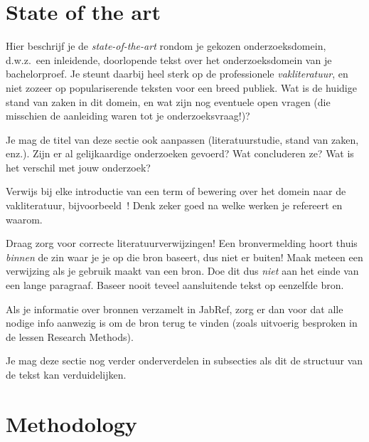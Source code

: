 \section{State of the art}%
\label{sec:state-of-the-art}

Hier beschrijf je de \emph{state-of-the-art} rondom je gekozen onderzoeksdomein, d.w.z.\ een inleidende, doorlopende tekst over het onderzoeksdomein van je bachelorproef. Je steunt daarbij heel sterk op de professionele \emph{vakliteratuur}, en niet zozeer op populariserende teksten voor een breed publiek. Wat is de huidige stand van zaken in dit domein, en wat zijn nog eventuele open vragen (die misschien de aanleiding waren tot je onderzoeksvraag!)?

Je mag de titel van deze sectie ook aanpassen (literatuurstudie, stand van zaken, enz.). Zijn er al gelijkaardige onderzoeken gevoerd? Wat concluderen ze? Wat is het verschil met jouw onderzoek?

Verwijs bij elke introductie van een term of bewering over het domein naar de vakliteratuur, bijvoorbeeld~\autocite{Hykes2013}! Denk zeker goed na welke werken je refereert en waarom.

Draag zorg voor correcte literatuurverwijzingen! Een bronvermelding hoort thuis \emph{binnen} de zin waar je je op die bron baseert, dus niet er buiten! Maak meteen een verwijzing als je gebruik maakt van een bron. Doe dit dus \emph{niet} aan het einde van een lange paragraaf. Baseer nooit teveel aansluitende tekst op eenzelfde bron.

Als je informatie over bronnen verzamelt in JabRef, zorg er dan voor dat alle nodige info aanwezig is om de bron terug te vinden (zoals uitvoerig besproken in de lessen Research Methods).


Je mag deze sectie nog verder onderverdelen in subsecties als dit de structuur van de tekst kan verduidelijken.

\section{Methodology}%
\label{sec:methodology}


